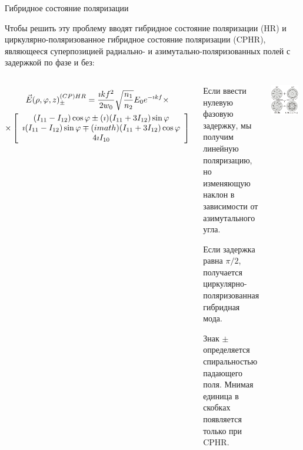 \documentclass[9pt, compress, xcolor=table]{beamer}
\begin{document}
\begin{frame}{Гибридное состояние поляризации}
    
\small{Чтобы решить эту проблему вводят гибридное состояние поляризации (HR) и циркулярно-поляризованное гибридное состояние поляризации (CPHR), являющееся суперпозицией радиально- и азимутально-поляризованных полей с задержкой по фазе и без:}
    \begin{columns}[c]
\column{7cm}
\begin{multline*}
\begin{gathered}
\vec E(\rho, \varphi, z)_{\pm}^{(CP)HR} = \frac{\imath k f^2}{2w_0} \sqrt
{\frac{n_1}{n_2}}E_0 e^{-\imath k f} \times\\\times \left[\array{c} 
(I_{11}-I_{12}) \cos \varphi \pm  (\imath)
(I_{11}+3 I_{12}) \sin \varphi \\  \imath (I_{11}-I_{12}) \sin
\varphi \mp (imath) (I_{11}+ 3 I_{12})
\cos \varphi\\ 4 \imath I_{10} \endarray\right]
\end{gathered}
\end{multline*}
\begin{enumerate}
  \small{  \item Если ввести нулевую фазовую задержку, мы получим линейную поляризацию, но изменяющую наклон в зависимости от азимутального угла.
    \item Если задержка равна $\pi/2$, получается циркулярно-поляризованная гибридная мода.
    \item Знак $\pm$ определяется спиральностью падающего поля. Мнимая единица в скобках появляется только при CPHR.}
\end{enumerate}
\column{5.5cm}
\begin{center}
\includegraphics[width=0.9\textwidth]{hybrid}
 \end{center}
 
\end{columns}
    
\end{frame}
\end{document}
